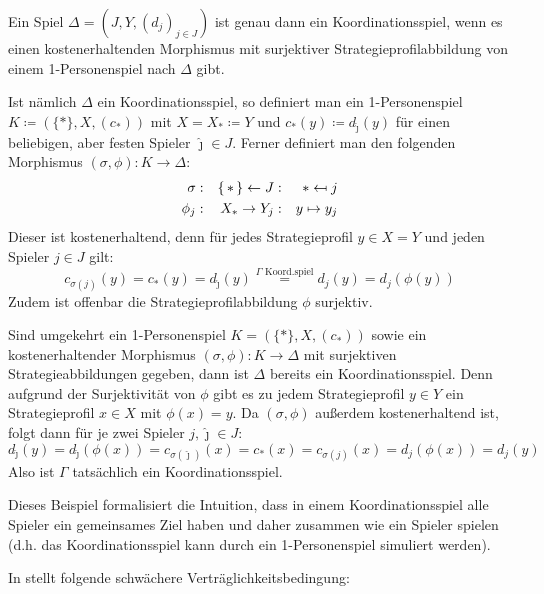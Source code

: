 \begin{bsp}\label{bsp:Koordinationsspiel}
	Ein Spiel $\Delta = (J, Y, (d_j)_{j \in J})$ ist genau dann ein Koordinationsspiel, wenn es einen kostenerhaltenden Morphismus mit surjektiver Strategieprofilabbildung von einem 1-Personenspiel nach $\Delta$ gibt.
	
	Ist nämlich $\Delta$ ein Koordinationsspiel, so definiert man ein 1-Personenspiel $K \coloneqq (\{\ast\}, X, (c_\ast))$ mit $X = X_\ast \coloneqq Y$ und $c_\ast(y) \coloneqq d_{\hat{\jmath}}(y)$ für einen beliebigen, aber festen Spieler $\hat{\jmath} \in J$. Ferner definiert man den folgenden Morphismus $(\sigma, \phi): K \to \Delta$:
	\begin{align*}
		\sigma:	&&\set{\ast}\leftarrow J:	&&\ast	\mapsfrom	j  \\
		\phi_j:	&&X_\ast	\to	 Y_j:	&&y		\mapsto		y_j
	\end{align*}	
	Dieser ist kostenerhaltend, denn für jedes Strategieprofil $y \in X = Y$ und jeden Spieler $j \in J$ gilt:
	\[c_{\sigma(j)}(y) = c_\ast(y) = d_{\hat{\jmath}}(y) \overset{\Gamma \text{ Koord.spiel}}{=} d_j(y) = d_j(\phi(y))\]
	Zudem ist offenbar die Strategieprofilabbildung $\phi$ surjektiv.
	
	Sind umgekehrt ein 1-Personenspiel $K = (\{\ast\}, X, (c_\ast))$ sowie ein kostenerhaltender Morphismus  $(\sigma, \phi): K \to \Delta$ mit surjektiven Strategieabbildungen gegeben, dann ist $\Delta$ bereits ein Koordinationsspiel. Denn aufgrund der Surjektivität von $\phi$ gibt es zu jedem Strategieprofil $y \in Y$ ein Strategieprofil $x \in X$ mit $\phi(x) = y$. Da $(\sigma, \phi)$ außerdem kostenerhaltend ist, folgt dann für je zwei Spieler $j, \hat{\jmath} \in J$: 
		\[d_{\hat{\jmath}}(y) = d_{\hat{\jmath}}(\phi(x)) = c_{\sigma(\hat{\jmath})}(x) = c_\ast(x) = c_{\sigma(j)}(x) = d_j(\phi(x)) = d_j(y)\]
	Also ist $\Gamma$ tatsächlich ein Koordinationsspiel.
\end{bsp}

Dieses Beispiel formalisiert die Intuition, dass in einem Koordinationsspiel alle Spieler ein gemeinsames Ziel haben und daher zusammen \glqq wie ein Spieler\grqq{} spielen (d.h. das Koordinationsspiel kann durch ein 1-Personenspiel simuliert werden).

%	

In \cite{LapGameCat} stellt \citeauthor[Definition 4.1]{LapGameCat} folgende schwächere Verträglichkeitsbedingung:

